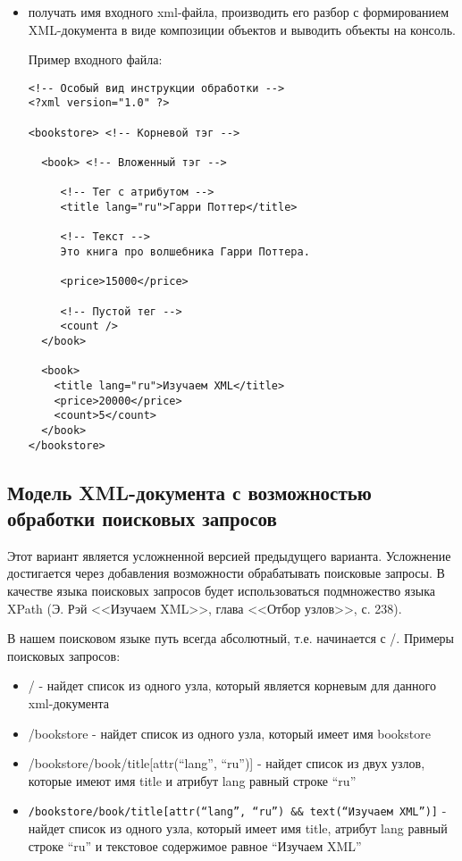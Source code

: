 \documentclass[a4paper,12pt]{article}
\begin{document}
\begin{itemize}
\item получать имя входного xml-файла, производить его разбор с
  формированием XML-документа в виде композиции объектов и выводить
  объекты на консоль.

  Пример входного файла:

\begin{verbatim}
<!-- Особый вид инструкции обработки -->
<?xml version="1.0" ?>

<bookstore> <!-- Корневой тэг -->

  <book> <!-- Вложенный тэг -->

     <!-- Тег с атрибутом -->
     <title lang="ru">Гарри Поттер</title>
     
     <!-- Текст -->
     Это книга про волшебника Гарри Поттера.
  
     <price>15000</price>

     <!-- Пустой тег -->
     <count />
  </book>

  <book>
    <title lang="ru">Изучаем XML</title>
    <price>20000</price>
    <count>5</count>
  </book>
</bookstore>
\end{verbatim}
\end{itemize}

\subsection{Модель XML-документа с возможностью обработки поисковых запросов}

Этот вариант является усложненной версией предыдущего
варианта. Усложнение достигается через добавления возможности
обрабатывать поисковые запросы. В качестве языка поисковых запросов
будет использоваться подмножество языка XPath (Э. Рэй <<Изучаем XML>>,
глава <<Отбор узлов>>, с. 238).

В нашем поисковом языке путь всегда абсолютный, т.е. начинается с /. Примеры поисковых запросов: 

\begin{itemize}
\item / - найдет список из одного узла, который является корневым для
  данного xml-документа
\item /bookstore - найдет список из одного узла, который имеет имя
  bookstore
\item /bookstore/book/title[attr(“lang”, “ru”)] - найдет список из
  двух узлов, которые имеют имя title и атрибут lang равный строке
  “ru”
\item
  \verb+/bookstore/book/title[attr(“lang”, “ru”) && text(“Изучаем XML”)]+
  - найдет список из одного узла, который имеет имя title, атрибут
  lang равный строке “ru” и текстовое содержимое равное “Изучаем XML”
\end{itemize}
\end{document}
